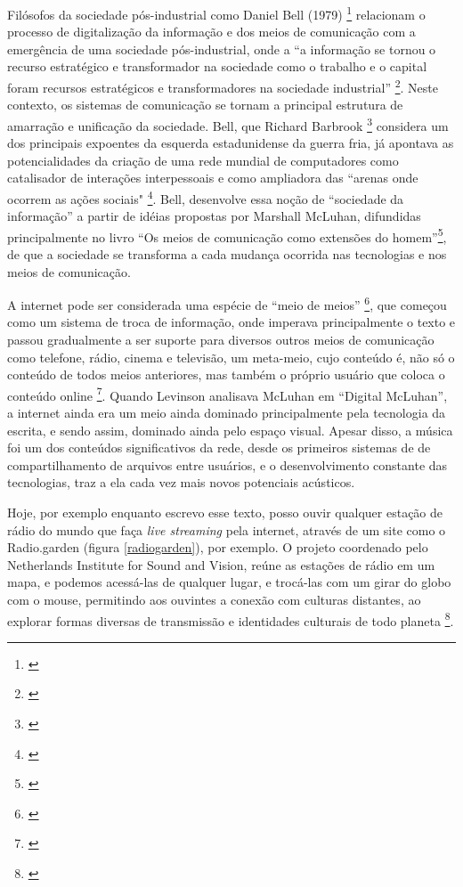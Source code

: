     
 Filósofos da sociedade pós-industrial como Daniel Bell (1979) \footnote{\cite{bell1979thinking}} relacionam o processo de digitalização da informação e dos meios de comunicação com a emergência de uma sociedade pós-industrial, onde a ``a informação se tornou o recurso estratégico e transformador na sociedade como o trabalho e o capital foram recursos estratégicos e transformadores na sociedade industrial'' \footnote{\cite[p. 26]{bell1979thinking}}. Neste contexto, os sistemas de comunicação se tornam a principal estrutura de amarração e unificação da sociedade. Bell, que Richard Barbrook \footnote{\cite{barbrook1999cyber}} considera um dos principais expoentes da esquerda estadunidense da guerra fria, já apontava as potencialidades da criação de uma rede mundial de computadores como catalisador de interações interpessoais e como ampliadora das ``arenas onde ocorrem as ações sociais" \footnote{\cite[p. 22]{bell1979thinking}}. Bell, desenvolve essa noção de ``sociedade da informação'' a partir de idéias propostas por Marshall McLuhan, difundidas principalmente no livro ``Os meios de comunicação como extensões do homem''\footnote{\cite{luhan1964marshall}}, de que a sociedade se  transforma a cada mudança ocorrida nas tecnologias e nos meios de comunicação. 
    
 A internet pode ser considerada uma espécie de ``meio de meios'' \footnote{\cite[p. 5]{Levinson2001}}, que começou como um sistema de troca de informação, onde imperava principalmente o texto e passou gradualmente a ser suporte para diversos outros  meios de comunicação como telefone, rádio, cinema e televisão, um meta-meio, cujo conteúdo é, não só o conteúdo de todos meios anteriores, mas também o próprio usuário que coloca o conteúdo online \footnote{\cite[p. 39]{Levinson2001}}. Quando Levinson analisava McLuhan em ``Digital McLuhan'', a internet ainda era um meio ainda dominado principalmente pela tecnologia da escrita, e sendo assim, dominado ainda pelo espaço visual. Apesar disso, a música foi um dos conteúdos significativos da rede, desde os primeiros sistemas de de compartilhamento de arquivos entre usuários, e o desenvolvimento constante das tecnologias, traz a ela cada vez mais novos potenciais acústicos.
    
Hoje, por exemplo enquanto escrevo esse texto, posso ouvir qualquer estação de rádio do mundo que faça \emph{live streaming} pela internet, através de um site como o Radio.garden (figura \ref{radiogarden}), por exemplo. O projeto coordenado pelo Netherlands Institute for Sound and Vision, reúne as estações de rádio em um mapa, e podemos acessá-las de qualquer lugar, e trocá-las com um girar do globo com o mouse, permitindo aos ouvintes a conexão com culturas distantes, ao explorar formas diversas de transmissão e identidades culturais de todo planeta \footnote{\cite{caroline2016radio}}. 

